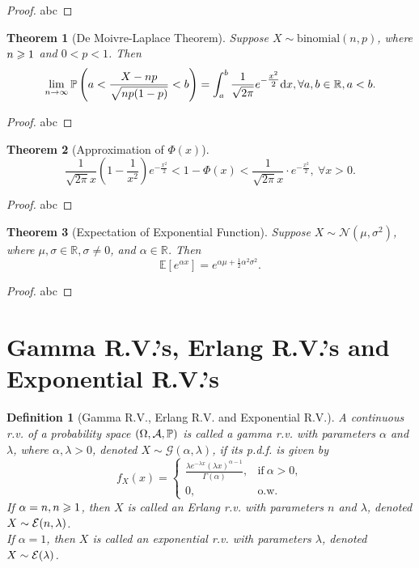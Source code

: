 \documentclass[openany,12pt]{book}
\newtheorem{theorem}{Theorem}[chapter]
\newtheorem{definition}{Definition}[chapter]
\begin{document}
\begin{proof}
  abc
\end{proof}

\begin{theorem}[De Moivre-Laplace Theorem]
  Suppose $X\sim \mathrm{binomial}(n,p)$, where $n\geqslant1$ and $0<p<1$. Then
  \[\lim_{n \to \infty}{\mathbb{P}\left( a < \frac{X - np}{\sqrt{np( 1 - p)}} < b \right)= \int_{a}^{b}\frac{1}{\sqrt{2\pi}}}e^{- \tfrac{x^{2}}{2}}\mathrm{d} x, \forall a,b \in \mathbb{R}, a < b.\]
\end{theorem}

\begin{proof}
  abc
\end{proof}

\begin{theorem}[Approximation of $\Phi(x)$]
  \[
    \frac{1}{\sqrt{2\pi}x}\left( 1 - \frac{1}{x^{2}} \right)e^{- \tfrac{{x}^{2}}{2}} < 1 - \Phi(x) < \frac{1}{\sqrt{2\pi}x} \cdot e^{- \tfrac{{x}^{2}}{2}},~\forall x > 0.
  \]
\end{theorem}

\begin{proof}
  abc
\end{proof}

\begin{theorem}[Expectation of Exponential Function]
  Suppose $X\sim \mathcal{N}(\mu,\sigma^2)$, where $\mu,\sigma\in\mathbb{R}, \sigma\neq0$, and $\alpha\in\mathbb{R}$.
  Then
  $$
    \mathbb{E}\left[e^{\alpha x}\right]=e^{\alpha\mu+\tfrac{1}{2}\alpha^2\sigma^2}.
  $$
\end{theorem}

\begin{proof}
  abc
\end{proof}

\section{Gamma R.V.'s, Erlang R.V.'s and Exponential R.V.'s}

\begin{definition}[Gamma R.V., Erlang R.V. and Exponential R.V.]
  A continuous r.v. of a probability space $(\Omega,\mathcal{A},\mathbb{P})$ is called a gamma r.v. with parameters $\alpha$ and $\lambda$, where $\alpha,\lambda>0$, denoted $X\sim \mathcal{G}(\alpha,\lambda)$, if its p.d.f. is given by
  \[
    f_{X}(x)=
    \begin{cases}
      \frac{\lambda e^{- \lambda x}{(\lambda x)}^{\alpha - 1}}{\Gamma( \alpha)}, &\text{if}~ \alpha > 0, \\
      0, &\text{o.w.}
    \end{cases}
  \]
  If $\alpha=n, n\geqslant1$, then $X$ is called an Erlang r.v. with parameters $n$ and $\lambda$, denoted $X\sim\mathcal{E}(n,\lambda)$.\\
  If $\alpha=1$, then $X$ is called an exponential r.v. with parameters $\lambda$, denoted $X\sim\mathcal{E}(\lambda)$.
\end{definition}
\end{document}
